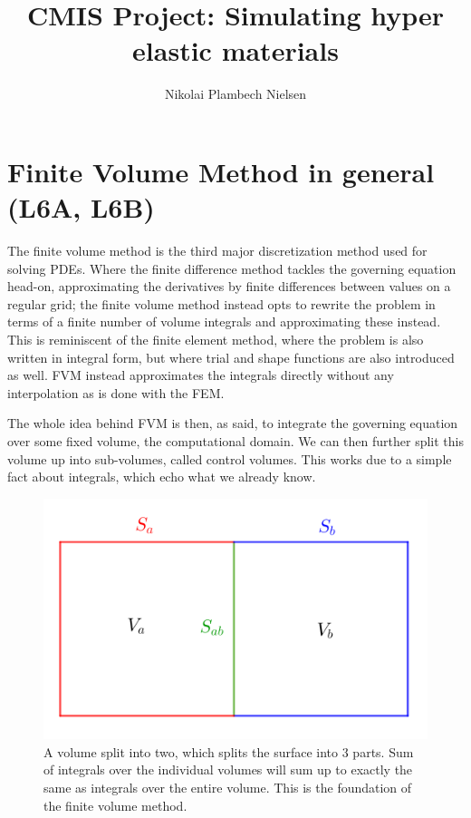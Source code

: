 \documentclass[sigconf]{acmart}
\begin{document}
%
\title{CMIS Project: Simulating hyper elastic materials}

\author{Nikolai Plambech Nielsen}


\maketitle
\section{Finite Volume Method in general (L6A, L6B)}
The finite volume method is the third major discretization method used for solving PDEs. Where the finite difference method tackles the governing equation head-on, approximating the derivatives by finite differences between values on a regular grid; the finite volume method instead opts to rewrite the problem in terms of a finite number of volume integrals and approximating these instead. This is reminiscent of the finite element method, where the problem is also written in integral form, but where trial and shape functions are also introduced as well. FVM instead approximates the integrals directly without any interpolation as is done with the FEM.

The whole idea behind FVM is then, as said, to integrate the governing equation over some fixed volume, the computational domain. We can then further split this volume up into sub-volumes, called control volumes. This works due to a simple fact about integrals, which echo what we already know.

\begin{figure}
	\centering
	\includegraphics[width=0.7\linewidth]{fvm.png}
	\caption{A volume split into two, which splits the surface into 3 parts. Sum of integrals over the individual volumes will sum up to exactly the same as integrals over the entire volume. This is the foundation of the finite volume method.}
	\label{fig:fvm}
\end{figure}
\end{document}
